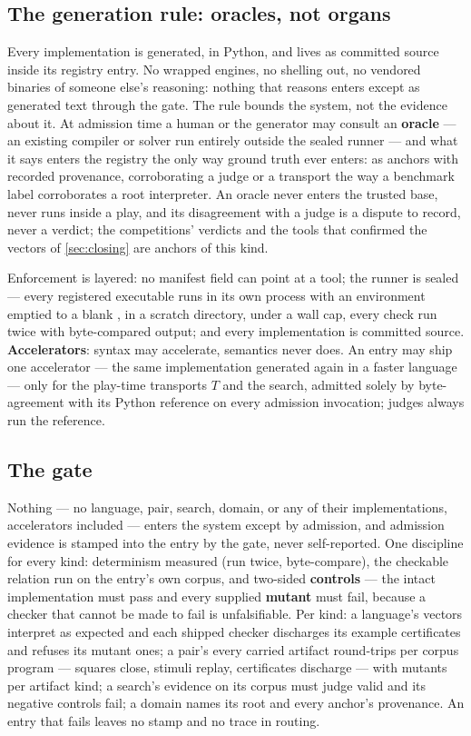 \subsection{The generation rule: oracles, not organs}
\label{sec:generation}

Every implementation is generated, in Python, and lives as committed
source inside its registry entry. No wrapped engines, no shelling
out, no vendored binaries of someone else's reasoning: nothing that
reasons enters except as generated text through the gate. The rule
bounds the system, not the evidence about it. At admission time a
human or the generator may consult an \textbf{oracle} --- an existing
compiler or solver run entirely outside the sealed runner --- and
what it says enters the registry the only way ground truth ever
enters: as anchors with recorded provenance, corroborating a judge or
a transport the way a benchmark label corroborates a root
interpreter. An oracle never enters the trusted base, never runs
inside a play, and its disagreement with a judge is a dispute to
record, never a verdict; the competitions' verdicts and the tools
that confirmed the vectors of \cref{sec:closing} are anchors of this
kind.

Enforcement is layered: no manifest field can point at a tool; the runner is sealed
--- every registered executable runs in its own process with an
environment emptied to a blank , in a scratch directory,
under a wall cap, every check
run twice with byte-compared output; and every implementation is
committed source. \textbf{Accelerators}: syntax may accelerate,
semantics never does. An entry may ship one accelerator --- the same
implementation generated again in a faster language --- only for the
play-time transports $T$ and the search, admitted solely by
byte-agreement with its Python reference on every admission
invocation; judges always run the reference.

\subsection{The gate}
\label{sec:gate}

Nothing --- no language, pair, search, domain, or any of their
implementations, accelerators included --- enters the system except
by admission, and admission evidence is stamped into the entry by the
gate, never self-reported. One discipline for every kind: determinism
measured (run twice, byte-compare), the checkable relation run on the
entry's own corpus, and two-sided \textbf{controls} --- the intact
implementation must pass and every supplied \textbf{mutant} must
fail, because a checker that cannot be made to fail is unfalsifiable.
Per kind: a language's vectors interpret as expected and each shipped
checker discharges its example certificates and refuses its mutant
ones; a pair's every carried artifact round-trips per corpus program
--- squares close, stimuli replay, certificates discharge --- with
mutants per artifact kind; a search's evidence on its corpus must
judge valid and its negative controls fail; a domain names its root
and every anchor's provenance. An entry that
fails leaves no stamp and no trace in routing.

